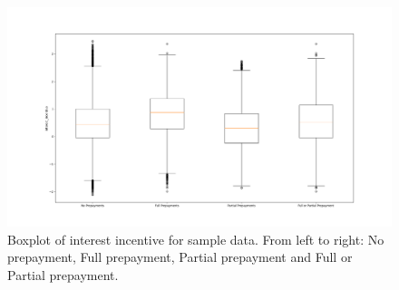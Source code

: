     \begin{figure}[H]
        \centering
        \includegraphics[width=\linewidth]{Figures/Boxplots_interest_incentive.png}
        \caption{
            Boxplot of interest incentive for sample data. From 
            left to right: No prepayment, Full prepayment, Partial 
            prepayment and Full or Partial prepayment.}
        \label{boxplots_incentive}
    \end{figure}
        
